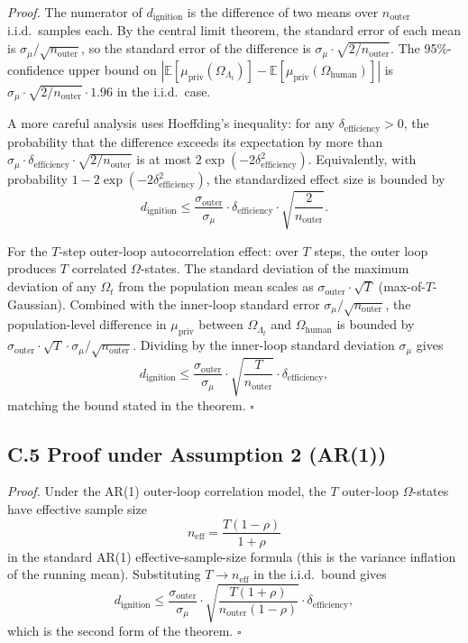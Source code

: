 \textit{Proof.} The numerator of $d_{\text{ignition}}$ is the difference of two means over $n_{\text{outer}}$ i.i.d.\ samples each. By the central limit theorem, the standard error of each mean is $\sigma_\mu / \sqrt{n_{\text{outer}}}$, so the standard error of the difference is $\sigma_\mu \cdot \sqrt{2/n_{\text{outer}}}$. The 95\%-confidence upper bound on $|\mathbb{E}[\mu_{\text{priv}}(\Omega_{\Lambda_t})] - \mathbb{E}[\mu_{\text{priv}}(\Omega_{\text{human}})]|$ is $\sigma_\mu \cdot \sqrt{2/n_{\text{outer}}} \cdot 1.96$ in the i.i.d.\ case.

A more careful analysis uses Hoeffding's inequality: for any $\delta_{\text{efficiency}} > 0$, the probability that the difference exceeds its expectation by more than $\sigma_\mu \cdot \delta_{\text{efficiency}} \cdot \sqrt{2/n_{\text{outer}}}$ is at most $2 \exp(-2 \delta_{\text{efficiency}}^2)$. Equivalently, with probability $1 - 2 \exp(-2 \delta_{\text{efficiency}}^2)$, the standardized effect size is bounded by
\[
d_{\text{ignition}} \le \frac{\sigma_{\text{outer}}}{\sigma_\mu} \cdot \delta_{\text{efficiency}} \cdot \sqrt{\frac{2}{n_{\text{outer}}}}.
\]

For the $T$-step outer-loop autocorrelation effect: over $T$ steps, the outer loop produces $T$ correlated $\Omega$-states. The standard deviation of the maximum deviation of any $\Omega_t$ from the population mean scales as $\sigma_{\text{outer}} \cdot \sqrt{T}$ (max-of-$T$-Gaussian). Combined with the inner-loop standard error $\sigma_\mu / \sqrt{n_{\text{outer}}}$, the population-level difference in $\mu_{\text{priv}}$ between $\Omega_{\Lambda_t}$ and $\Omega_{\text{human}}$ is bounded by $\sigma_{\text{outer}} \cdot \sqrt{T} \cdot \sigma_\mu / \sqrt{n_{\text{outer}}}$. Dividing by the inner-loop standard deviation $\sigma_\mu$ gives
\[
d_{\text{ignition}} \le \frac{\sigma_{\text{outer}}}{\sigma_\mu} \cdot \sqrt{\frac{T}{n_{\text{outer}}}} \cdot \delta_{\text{efficiency}},
\]
matching the bound stated in the theorem. \hfill$\square$

\subsection*{C.5 Proof under Assumption 2 (AR(1))}

\textit{Proof.} Under the AR(1) outer-loop correlation model, the $T$ outer-loop $\Omega$-states have effective sample size
\[
n_{\text{eff}} = \frac{T (1 - \rho)}{1 + \rho}
\]
in the standard AR(1) effective-sample-size formula (this is the variance inflation of the running mean). Substituting $T \to n_{\text{eff}}$ in the i.i.d.\ bound gives
\[
d_{\text{ignition}} \le \frac{\sigma_{\text{outer}}}{\sigma_\mu} \cdot \sqrt{\frac{T(1+\rho)}{n_{\text{outer}}(1-\rho)}} \cdot \delta_{\text{efficiency}},
\]
which is the second form of the theorem. \hfill$\square$

